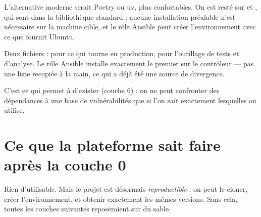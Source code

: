 L'alternative moderne serait Poetry ou uv, plus confortables. On est resté sur
 et , qui sont dans la bibliothèque standard : aucune
installation préalable n'est nécessaire sur la machine cible, et le rôle Ansible
peut créer l'environnement avec ce que fournit Ubuntu.

\role
Deux fichiers :  pour ce qui tourne en production,
 pour l'outillage de tests et d'analyse. Le rôle
Ansible  installe exactement le premier sur le contrôleur --- pas
une liste recopiée à la main, ce qui a déjà été une source de divergence.

\apport
C'est ce qui permet à  d'exister (couche 6) : on ne peut
confronter des dépendances à une base de vulnérabilités que si l'on sait
exactement lesquelles on utilise.

\section*{Ce que la plateforme sait faire après la couche 0}

Rien d'utilisable. Mais le projet est désormais \emph{reproductible} : on peut
le cloner, créer l'environnement, et obtenir exactement les mêmes versions. Sans
cela, toutes les couches suivantes reposeraient sur du sable.
